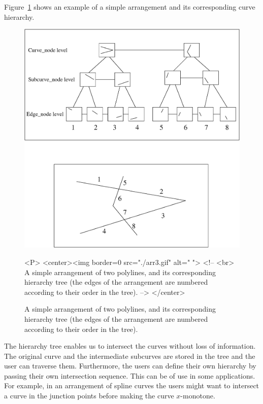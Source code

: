 Figure~\ref{fig:hierarchy} shows an example of a simple arrangement and its 
corresponding curve hierarchy.


\begin{figure}
\begin{ccTexOnly}
{\centering \resizebox*{0.8\textwidth}{0.6\textheight}%
{\includegraphics{arr3.eps}}}
\end{ccTexOnly}
\caption{A simple arrangement of two polylines, and its corresponding
hierarchy tree (the edges of the arrangement are numbered according to
their order in the tree).\label{fig:hierarchy}}
\begin{ccHtmlOnly}
<P>
<center><img border=0 src="./arr3.gif" alt=" ">
<!--
<br>
A simple arrangement of two polylines, and its corresponding hierarchy tree
(the edges of the arrangement are numbered according to their order
in the tree).
-->
</center>
\end{ccHtmlOnly}
\end{figure}

The hierarchy tree enables us to intersect the curves without loss of
information. The original curve and the intermediate subcurves are stored
in the tree and the user can traverse them. Furthermore, the users can
define their own hierarchy by passing their own intersection sequence.
This can be of use in some applications. For example, in an arrangement
of spline curves the users might want to intersect a curve in the
junction points before making the curve $x$-monotone. 

